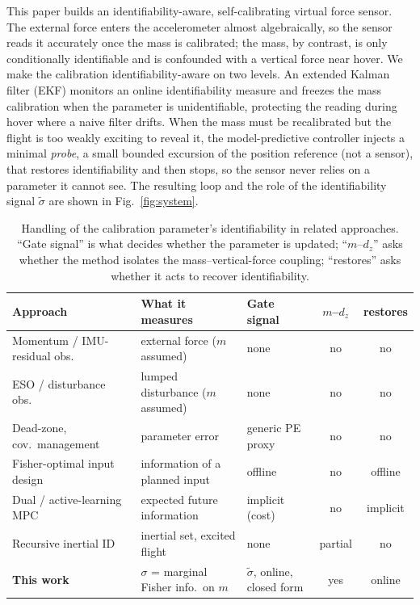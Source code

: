 \documentclass{ieeeaccess}
\begin{document}
This paper builds an identifiability-aware, self-calibrating virtual force sensor.
The external force enters the accelerometer almost algebraically, so the sensor
reads it accurately once the mass is calibrated; the mass, by contrast, is only
conditionally identifiable and is confounded with a vertical force near hover. We
make the calibration identifiability-aware on two levels. An extended Kalman filter
(EKF) monitors an online identifiability measure and freezes the mass calibration
when the parameter is unidentifiable, protecting the reading during hover where a
naive filter drifts. When the mass must be recalibrated but the flight is too
weakly exciting to reveal it, the model-predictive controller injects a minimal
\emph{probe}, a small bounded excursion of the position reference (not a sensor),
that restores identifiability and then stops, so the sensor never relies on a
parameter it cannot see. The resulting loop and the role of the identifiability
signal $\tilde\sigma$ are shown in Fig.~\ref{fig:system}.

\begin{table}[t]
\centering
\caption{Handling of the calibration parameter's identifiability in related
approaches. ``Gate signal'' is what decides whether the parameter is updated;
``$m$--$d_z$'' asks whether the method isolates the mass--vertical-force
coupling; ``restores'' asks whether it acts to recover identifiability.}
\label{tab:related}
\small
\begin{tabular}{lllcc}
\toprule
Approach & What it measures & Gate signal & $m$--$d_z$ & restores \\
\midrule
Momentum / IMU-residual obs.~\cite{tomic2017external,ruggiero2014impedance} & external force ($m$ assumed) & none & no & no \\
ESO / disturbance obs.~\cite{han2009pid,chen2016disturbance} & lumped disturbance ($m$ assumed) & none & no & no \\
Dead-zone, cov.\ management~\cite{ioannou1996robust,narendra1987persistent} & parameter error & generic PE proxy & no & no \\
Fisher-optimal input design~\cite{mehra1974optimal,morelli2022inertia} & information of a planned input & offline & no & offline \\
Dual / active-learning MPC~\cite{mesbah2018dual} & expected future information & implicit (cost) & no & implicit \\
Recursive inertial ID~\cite{wuest2019online,burri2018system,boyacioglu2023inertial} & inertial set, excited flight & none & partial & no \\
\textbf{This work} & $\sigma$ = marginal Fisher info.\ on $m$ & $\tilde\sigma$, online, closed form & yes & online \\
\bottomrule
\end{tabular}
\end{table}
\end{document}
